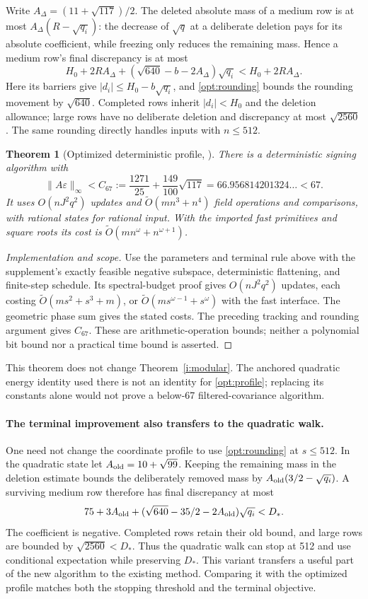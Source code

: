 \documentclass[11pt]{amsart}
\newtheorem{theorem}{Theorem}[section]
\theoremstyle{definition}\newtheorem{definition}[theorem]{Definition}
\theoremstyle{remark}\newtheorem{remark}[theorem]{Remark}
\numberwithin{equation}{section}
\begin{document}
Write $A_\Delta=(11+\sqrt{117})/2$.
The deleted absolute mass of a medium row is at most
$A_\Delta(R-\sqrt{q_i})$: the decrease of $\sqrt q$ at a deliberate
deletion pays for its absolute coefficient, while freezing only
reduces the remaining mass. Hence a medium row's final discrepancy is
at most
\[
 H_0+2RA_\Delta+
       (\sqrt{640}-b-2A_\Delta)\sqrt{q_i}<H_0+2RA_\Delta.
\]
Here its barriers give $|d_i|\le H_0-b\sqrt{q_i}$, and
\eqref{opt:rounding} bounds the rounding movement by $\sqrt{640}$.
Completed rows inherit $|d_i|<H_0$ and the deletion allowance; large
rows have no deliberate deletion and discrepancy at most
$\sqrt{2560}$. The same rounding directly handles inputs with
$n\le512$.

\begin{theorem}[Optimized deterministic profile, \cite{Below67}]
\label{opt:guarantee}
There is a deterministic signing algorithm with
\[
 \|A\varepsilon\|_\infty<C_{67}:=
 \frac{1271}{25}+\frac{149}{100}\sqrt{117}
 =66.956814201324\ldots<67.
\]
It uses $O(nJ^2q^2)$ updates and
$\widetilde O(mn^3+n^4)$ field operations and comparisons, with rational
states for rational input. With the imported fast primitives and square
roots its cost is $\widetilde O(mn^\omega+n^{\omega+1})$.
\end{theorem}
\begin{proof}[Implementation and scope]
Use the parameters and terminal rule above with the supplement's
exactly feasible negative subspace, deterministic flattening, and
finite-step schedule. Its spectral-budget proof gives $O(nJ^2q^2)$
updates, each costing $\widetilde O(ms^2+s^3+m)$, or
$\widetilde O(ms^{\omega-1}+s^\omega)$ with the fast interface.
The geometric phase sum gives the stated costs. The preceding tracking
and rounding argument gives $C_{67}$. These are arithmetic-operation
bounds; neither a polynomial bit bound nor a practical time bound is
asserted.
\end{proof}

This theorem does not change Theorem~\ref{i:modular}. The anchored
quadratic energy identity used there is not an identity for
\eqref{opt:profile}; replacing its constants alone would not prove a
below-67 filtered-covariance algorithm.

\paragraph{The terminal improvement also transfers to the quadratic walk.}
One need not change the coordinate profile to use
\eqref{opt:rounding} at $s\le512$. In the quadratic state let
$A_{\rm old}=10+\sqrt{99}$. Keeping the remaining mass in the deletion
estimate bounds the deliberately removed mass by
$A_{\rm old}(3/2-\sqrt{q_i})$. A surviving medium row therefore has
final discrepancy at most
\[
 75+3A_{\rm old}+
       (\sqrt{640}-35/2-2A_{\rm old})\sqrt{q_i}<D_*.
\]
The coefficient is negative. Completed rows retain their old bound, and
large rows are bounded by $\sqrt{2560}<D_*$. Thus the quadratic walk
can stop at 512 and use conditional expectation while preserving $D_*$.
This variant transfers a useful part of the new algorithm to the
existing method. Comparing it with the optimized profile matches both
the stopping threshold and the terminal objective.
\end{document}
